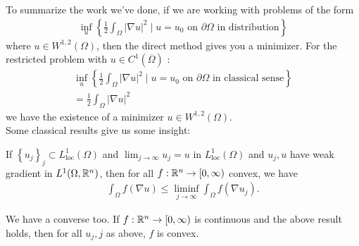 \documentclass{memoir}
\begin{document}
To summarize the work we've done, if we are working with problems of the form
\begin{align*}
	\inf_{u} \left\{\frac{1}{2}\int_\Omega \left| \nabla u \right|^2 \mid u = u_0 \text{ on }\partial \Omega  \text{ in distribution} \right\} 
\end{align*}
where \(u \in W^{1,2}(\Omega )\), then the direct method gives you a minimizer. For the restricted problem with \(u \in C^{1}(\overline{\Omega })\) :
\begin{align*}
	\inf_{u} \left\{\frac{1}{2}\int_\Omega \left| \nabla u \right|^2 \mid u = u_0 \text{ on }\partial\Omega  \text{ in classical sense} \right\} \\
	= \frac{1}{2}\int_\Omega  \left| \nabla u \right|^2
\end{align*}
we have the existence of a minimizer \(u \in W^{1,2}(\Omega )\).\\

Some classical results give us some insight:
\begin{thm}[Serrin '61]
	If \(\left\{ u_j \right\}_j \subset L^{1}_{\textrm{loc}}(\Omega )\) and \(\lim_{j \to \infty} u_j = u\) in \(L^{1}_{\textrm{loc}}(\Omega )\) and \(u_j,u\) have weak gradient in \(L^{1}(\Omega ,\mathbb{R}^{n})\), then for all \(f:\mathbb{R}^{n}\to [0,\infty)\) convex, we have
	\begin{align*}
		\int_\Omega f(\nabla u) \leq \liminf_{j \to \infty} \int_\Omega f(\nabla u_j).
	\end{align*}
\end{thm}
We have a converse too. If \(f:\mathbb{R}^{n}\to [0,\infty)\) is continuous and the above result holds, then for all \(u_j,j\) as above, \(f\) is convex.
\end{document}
